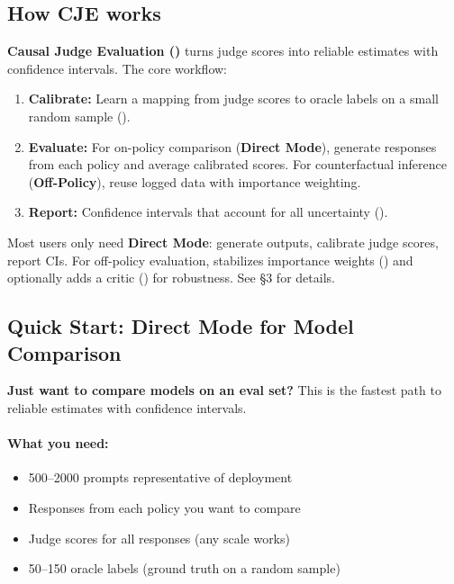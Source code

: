 \subsection{How CJE works}

\textbf{Causal Judge Evaluation (\cje)} turns judge scores into reliable estimates with confidence intervals. The core workflow:

\begin{enumerate}
\item \textbf{Calibrate:} Learn a mapping from judge scores to oracle labels on a small random sample (\autocal).
\item \textbf{Evaluate:} For on-policy comparison (\textbf{Direct Mode}), generate responses from each policy and average calibrated scores. For counterfactual inference (\textbf{Off-Policy}), reuse logged data with importance weighting.
\item \textbf{Report:} Confidence intervals that account for all uncertainty (\oua).
\end{enumerate}

Most users only need \textbf{Direct Mode}: generate outputs, calibrate judge scores, report CIs. For off-policy evaluation, \cje{} stabilizes importance weights (\simcal) and optionally adds a critic (\dr) for robustness. See §3 for details.

\subsection{Quick Start: Direct Mode for Model Comparison}

\textbf{Just want to compare models on an eval set?} This is the fastest path to reliable estimates with confidence intervals.

\paragraph{What you need:}
\begin{itemize}
\item 500--2000 prompts representative of deployment
\item Responses from each policy you want to compare
\item Judge scores for all responses (any scale works)
\item 50--150 oracle labels (ground truth on a random sample)
\end{itemize}

